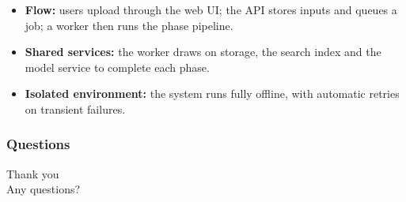 \documentclass{beamer}
\begin{document}
\begin{frame}
\begin{center}
{
}
\end{center}
\vspace{0.2cm}
\begin{itemize}\setlength\itemsep{2pt}
  \item \textbf{Flow:} users upload through the web UI; the API stores inputs and queues a job; a worker then runs the phase pipeline.
  \item \textbf{Shared services:} the worker draws on storage, the search index and the model service to complete each phase.
  \item \textbf{Isolated environment:} the system runs fully offline, with automatic retries on transient failures.
\end{itemize}
\end{frame}


\begin{frame}
\frametitle{Questions}
\begin{center}
\Large Thank you \\ Any questions?
\end{center}
\end{frame}
\end{document}
